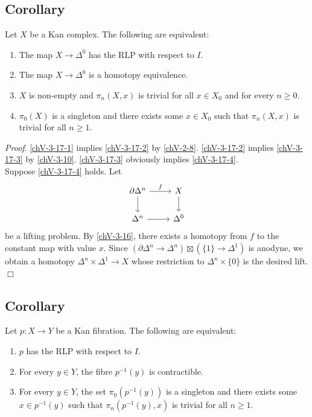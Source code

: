     \subsection{Corollary}\label{chV-3-17}
        Let $X$ be a Kan complex. The following are equivalent:
        \begin{enumerate}[label=\roman*)]
            \item 
                The map $X \to \Delta^0$ has the RLP with respect to $I$.\label{chV-3-17-1}
            \item 
                The map $X \to \Delta^0$ is a homotopy equivalence.\label{chV-3-17-2}
            \item 
                $X$ is non-empty and $\pi_n(X, x)$ is trivial for all $x \in X_0$ and for every $n \geq 0$.\label{chV-3-17-3}
            \item 
                $\pi_0(X)$ is a singleton and there exists some $x \in X_0$ such that $\pi_n(X, x)$ is trivial for all $n \geq 1$.\label{chV-3-17-4}
        \end{enumerate}
        \smallskip

        \emph{Proof}. \ref{chV-3-17-1} implies \ref{chV-3-17-2} by \ref{chV-2-8}. \ref{chV-3-17-2} implies \ref{chV-3-17-3} by \ref{chV-3-10}. \ref{chV-3-17-3} obviously implies \ref{chV-3-17-4}.\\
        Suppose \ref{chV-3-17-4} holds. Let
        \begin{equation*}
            \begin{tikzcd}
                \partial \Delta^n \arrow[d] \arrow[r, "f"] & X \arrow[d] \\
                \Delta^n \arrow[r] & \Delta^0
            \end{tikzcd}
        \end{equation*}
        be a lifting problem. By \ref{chV-3-16}, there exists a homotopy from $f$ to the constant map with value $x$. Since $(\partial \Delta^n \to \Delta^n) \boxtimes (\{1\} \to \Delta^1)$ is anodyne, we obtain a homotopy $\Delta^n \times \Delta^1 \to X$ whose restriction to $\Delta^n \times \{0\}$ is the desired lift.\hfill$\Box$

    \subsection{Corollary}\label{chV-3-18}
        Let $p \colon X \to Y$ be a Kan fibration. The following are equivalent:
        \begin{enumerate}[label=\roman*)]
            \item 
                $p$ has the RLP with respect to $I$.\label{chV-3-18-1}
            \item 
                For every $y \in Y$, the fibre $p^{-1}(y)$ is contractible.\label{chV-3-18-2}
            \item 
                For every $y \in Y$, the set $\pi_0(p^{-1}(y))$ is a singleton and there exists some $x \in p^{-1}(y)$ such that $\pi_n(p^{-1}(y), x)$ is trivial for all $n \geq 1$.\label{chV-3-18-3}
        \end{enumerate}
        \smallskip

